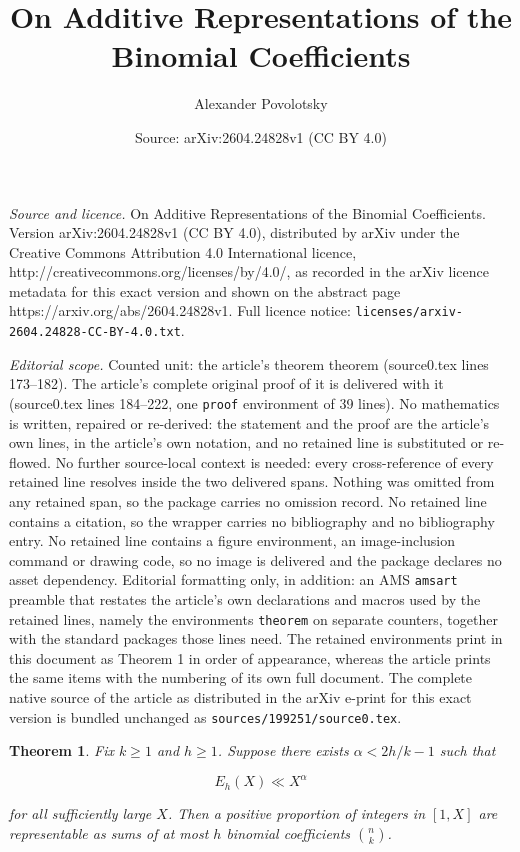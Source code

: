 \documentclass[10pt,a4paper]{amsart}
\title{On Additive Representations of the Binomial Coefficients}
\author{Alexander Povolotsky}
\date{Source: arXiv:2604.24828v1 (CC BY 4.0)}
\newtheorem{theorem}{Theorem}
\begin{document}
\maketitle

\noindent\emph{Source and licence.} On Additive Representations of the Binomial Coefficients. Version arXiv:2604.24828v1 (CC BY 4.0), distributed by arXiv under the Creative Commons Attribution 4.0 International licence, http://creativecommons.org/licenses/by/4.0/, as recorded in the arXiv licence metadata for this exact version and shown on the abstract page https://arxiv.org/abs/2604.24828v1. Full licence notice: \texttt{licenses/arxiv-2604.24828-CC-BY-4.0.txt}.\par\smallskip

\noindent\textit{Editorial scope.} Counted unit: the article's theorem theorem (source0.tex lines 173--182). The article's complete original proof of it is delivered with it (source0.tex lines 184--222, one \texttt{proof} environment of 39 lines). No mathematics is written, repaired or re-derived: the statement and the proof are the article's own lines, in the article's own notation, and no retained line is substituted or re-flowed.  No further source-local context is needed: every cross-reference of every retained line resolves inside the two delivered spans.  Nothing was omitted from any retained span, so the package carries no omission record.  No retained line contains a citation, so the wrapper carries no bibliography and no bibliography entry.  No retained line contains a figure environment, an image-inclusion command or drawing code, so no image is delivered and the package declares no asset dependency.  Editorial formatting only, in addition: an AMS \texttt{amsart} preamble that restates the article's own declarations and macros used by the retained lines, namely the environments \texttt{theorem} on separate counters, together with the standard packages those lines need.  The retained environments print in this document as Theorem 1 in order of appearance, whereas the article prints the same items with the numbering of its own full document.  The complete native source of the article as distributed in the arXiv e-print for this exact version is bundled unchanged as \texttt{sources/199251/source0.tex}.
\begin{theorem}
Fix $k \ge 1$ and $h \ge 1$. Suppose there exists $\alpha < 2h/k - 1$ such that

\[
E_h(X) \ll X^\alpha
\]

for all sufficiently large $X$. Then a positive proportion of integers in $[1,X]$
are representable as sums of at most $h$ binomial coefficients $\binom{n}{k}$.
\end{theorem}
\end{document}
